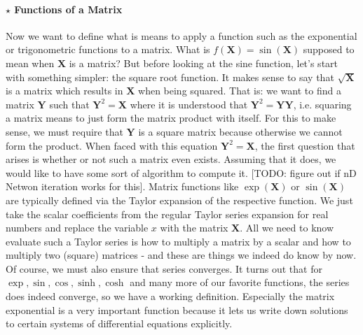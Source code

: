 \paragraph{$\star$ Functions of a Matrix}
Now we want to define what is means to apply a function such as the exponential or trigonometric functions to a matrix. What is $f(\mathbf{X}) = \sin(\mathbf{X})$ supposed to mean when $\mathbf{X}$ is a matrix? But before looking at the sine function, let's start with something simpler: the square root function. It makes sense to say that $\sqrt{\mathbf{X}}$ is a matrix which results in $\mathbf{X}$ when being squared. That is: we want to find a matrix $\mathbf{Y}$ such that $\mathbf{Y}^2 = \mathbf{X}$ where it is understood that $\mathbf{Y}^2 = \mathbf{Y Y}$, i.e. squaring a matrix means to just form the matrix product with itself. For this to make sense, we must require that $\mathbf{Y}$ is a square matrix because otherwise we cannot form the product. When faced with this equation $\mathbf{Y}^2 = \mathbf{X}$, the first question that arises is whether or not such a matrix even exists. Assuming that it does, we would like to have some sort of algorithm to compute it. [TODO: figure out if nD Netwon iteration works for this]. Matrix functions like $\exp(\mathbf{X})$ or $\sin(\mathbf{X})$ are typically defined via the Taylor expansion of the respective function. We just take the scalar coefficients from the regular Taylor series expansion for real numbers and replace the variable $x$ with the matrix  $\mathbf{X}$. All we need to know evaluate such a Taylor series is how to multiply a matrix by a scalar and how to multiply two (square) matrices - and these are things we indeed do know by now. Of course, we must also ensure that series converges. It turns out that for $\exp, \sin, \cos, \sinh, \cosh$ and many more of our favorite functions, the series does indeed converge, so we have a working definition. Especially the matrix exponential is a very important function because it lets us write down solutions to certain systems of differential equations explicitly.





